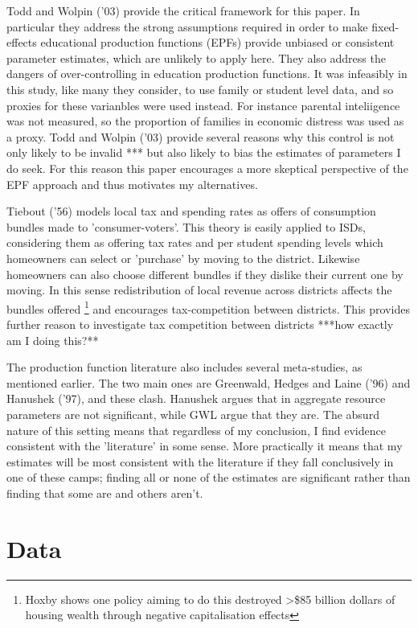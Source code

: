 \documentclass[11pt]{article}
\begin{document}
Todd and Wolpin ('03) provide the critical framework for this paper. In particular they address the strong assumptions required in order to make fixed-effects educational production functions (EPFs) provide unbiased or consistent parameter estimates, which are unlikely to apply here. They also address the dangers of over-controlling in education production functions. It was infeasibly in this study, like many they consider, to use family or student level data, and so proxies for these varianbles were used instead. For instance parental inteliigence was not measured, so the proportion of families in economic distress was used as a proxy. Todd and Wolpin ('03) provide several reasons why this control is not only likely to be invalid *** but also likely to bias the estimates of parameters I do seek. For this reason this paper encourages a more skeptical perspective of the EPF approach and thus motivates my alternatives. 

Tiebout ('56) models local tax and spending rates as offers of consumption bundles made to 'consumer-voters'. This theory is easily applied to ISDs, considering them as offering tax rates and per student spending levels which homeowners can select or 'purchase' by moving to the district. Likewise homeowners can also choose different bundles if they dislike their current one by moving. In this sense redistribution of local revenue across districts affects the bundles offered \footnote{Hoxby shows one policy aiming to do this destroyed \textgreater\$85 billion dollars of housing wealth through negative capitalisation effects} and encourages tax-competition between districts. This provides further reason to investigate tax competition between districts ***how exactly am I doing this?**

The production function literature also includes several meta-studies, as mentioned earlier. The two main ones are Greenwald, Hedges and Laine ('96) and Hanushek ('97), and these clash. Hanushek argues that in aggregate resource parameters are not significant, while GWL argue that they are. The absurd nature of this setting means that regardless of my conclusion, I find evidence consistent with the 'literature' in some sense. More practically it means that my estimates will be most consistent with the literature if they fall conclusively in one of these camps; finding all or none of the estimates are significant rather than finding that some are and others aren't.

\section{Data}
\end{document}
